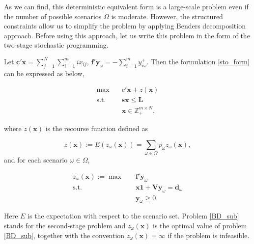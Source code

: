 As we can find, this deterministic equivalent form is a large-scale problem even if the number of possible scenarios $\Omega$ is moderate. However, the structured constraints allow us to simplify the problem by applying Benders decomposition approach. Before using this approach, let us write this problem in the form of the two-stage stochastic programming.

Let $\mathbf{c}{'}\mathbf{x} = \sum_{j =1}^{N} \sum_{i=1}^m i x_{ij}$, $\mathbf{f}{'}\mathbf{y}_{\omega} = -\sum_{i=1}^{m} y_{i \omega}^{+}$. Then the formulation \eqref{sto_form} can be expressed as below,

\begin{equation}\label{BD_master}
  \begin{aligned}
\max \quad & c{'} \mathbf{x}+ z(\mathbf{x}) \\
\text {s.t.} \quad & \mathbf{s} \mathbf{x} \leq \mathbf{L} \\
& \mathbf{x} \in \mathbb{Z}_{+}^{m \times N},
\end{aligned}
\end{equation}

where $z(\mathbf{x})$ is the recourse function defined as 

$$z(\mathbf{x}) := E(z_{\omega}(\mathbf{x})) = \sum_{\omega \in \Omega} p_{\omega} z_{\omega}(\mathbf{x}),$$ and for each scenario $\omega \in \Omega$, 

\begin{equation}\label{BD_sub}
  \begin{aligned}
    z_{\omega}(\mathbf{x}) := \max \quad & \mathbf{f}{'} \mathbf{y}_{\omega} \\
    \text {s.t.} \quad & \mathbf{x} \mathbf{1} + \mathbf{V} \mathbf{y}_{\omega} = \mathbf{d}_{\omega} \\
     & \mathbf{y}_{\omega} \geq 0.
  \end{aligned}
  \end{equation}


Here $E$ is the expectation with respect to the scenario set. Problem \eqref{BD_sub} stands for the second-stage problem and $z_{\omega}(\mathbf{x})$ is the optimal value of problem \eqref{BD_sub}, together with the convention $z_{\omega}(\mathbf{x}) = \infty$ if the problem is infeasible.

